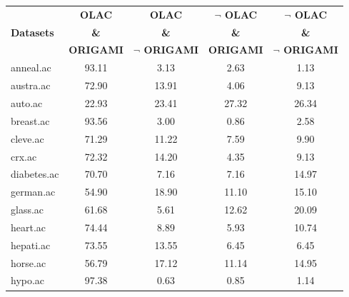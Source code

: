 \begin{table}[htbp]
	\centering
		\renewcommand{\tabcolsep}{1.8mm}
		\begin{tabular}{|l|c|c|c|c|}
		\hline
				& \textbf{OLAC}		& \textbf{OLAC}			& \textbf{$\neg$ OLAC}	& \textbf{$\neg$ OLAC}	\\
		\textbf{Datasets}	& \textbf{\&}		& \textbf{\&}			& \textbf{\&}			& \textbf{\&}			\\
				& \textbf{ORIGAMI}	& \textbf{$\neg$ ORIGAMI}	& \textbf{ORIGAMI}		& \textbf{$\neg$ ORIGAMI}	\\
		\hline
		anneal.ac       & 93.11         & 3.13               & 2.63                     & 1.13                          \\
		\hline
		austra.ac       & 72.90         & 13.91              & 4.06                     & 9.13                          \\
		\hline
		auto.ac         & 22.93         & 23.41              & 27.32                    & 26.34                         \\
		\hline
		breast.ac       & 93.56         & 3.00               & 0.86                     & 2.58                          \\
		\hline
		cleve.ac        & 71.29         & 11.22              & 7.59                     & 9.90                          \\
		\hline
		crx.ac          & 72.32         & 14.20              & 4.35                     & 9.13                          \\
		\hline
		diabetes.ac     & 70.70         & 7.16               & 7.16                     & 14.97                         \\
		\hline
		german.ac       & 54.90         & 18.90              & 11.10                    & 15.10                         \\
		\hline
		glass.ac        & 61.68         & 5.61               & 12.62                    & 20.09                         \\
		\hline
		heart.ac        & 74.44         & 8.89               & 5.93                     & 10.74                         \\
		\hline
		hepati.ac       & 73.55         & 13.55              & 6.45                     & 6.45                          \\
		\hline
		horse.ac        & 56.79         & 17.12              & 11.14                    & 14.95                         \\
		\hline
		hypo.ac         & 97.38         & 0.63               & 0.85                     & 1.14                          \\

\end{tabular}
\end{table}
